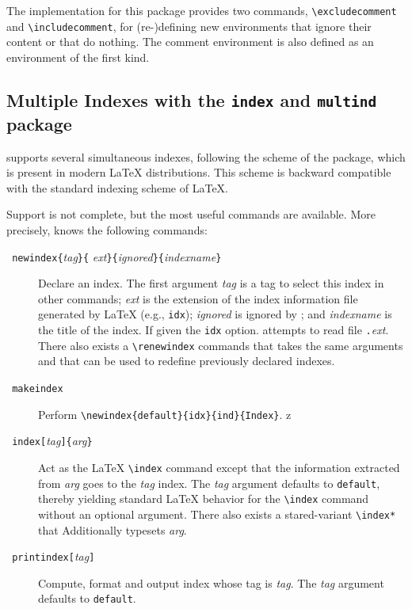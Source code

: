The implementation for this package provides two commands,
\verb+\excludecomment+ and \verb+\includecomment+, for (re-)defining
new environments that ignore their content or that do nothing. The
comment environment is also defined as an environment of the first
kind.

\subsection{Multiple Indexes with the \texttt{index} and
\texttt{multind}\label{multind} package}
%
\hevea{} supports several simultaneous indexes, following the scheme
of the
 package,
which is present in modern \LaTeX{} distributions.
This scheme is backward compatible with the standard indexing scheme
of \LaTeX.

Support is not complete, but the most useful commands are available.
More precisely, \hevea{} knows the following commands:
\begin{description}
\item[{\tt{} newindex\{}{\it tag}{\tt \}\{}{\it
ext}{\tt\}\{}{\it ignored}{\tt\}\{}{\it indexname}{\tt\}}]
Declare an index.
The first argument {\it tag} is a tag to select this index in other
commands; {\it ext} is the extension of the index information file
generated by \LaTeX{} (e.g., \texttt{idx}); {\it ignored} is ignored by
\hevea{}; and {\it indexname} is the title of the index.
If given the \verb+idx+ option. \hevea{} attempts to read file
\texttt{.}{\it ext}. There also exists a
\verb+\renewindex+ commands that takes the same arguments and that can be
used to redefine previously declared indexes.
\item[{\tt{} makeindex}] Perform
\verb+\newindex{default}{idx}{ind}{Index}+.
z\item[{\tt{} index[}{\it tag}{\tt]\{}{\it arg}{\tt\}}]
Act as the \LaTeX{} \verb+\index+ command except that the information
extracted from {\it arg} goes to the {\it tag} index.
The {\it tag} argument defaults to \verb+default+, thereby yielding
standard \LaTeX{} behavior for the \verb+\index+ command without an
optional argument.
There also exists a stared-variant \verb+\index*+ that Additionally
typesets {\it arg}.
\item[{\tt{} printindex[}{\it tag}{\tt]}] Compute, format and
output index whose tag is \textit{tag}. The {\it tag} argument
defaults to \verb+default+.
\end{description}


